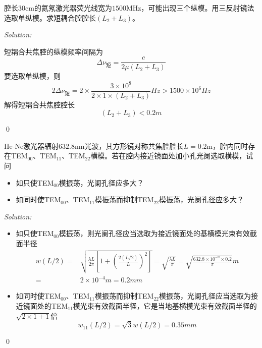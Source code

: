 \documentclass[12pt,a4paper]{article}
\newenvironment{problem}[2][Problem]{\begin{trivlist}
\item[\hskip \labelsep {\bfseries #1}\hskip \labelsep {\bfseries #2.}]}{\end{trivlist}}
\newenvironment{sol}
    {\emph{Solution:}
    }
    {
    \qed
    }
\begin{document}
\begin{problem}{4.1}
腔长$30$cm的氦氖激光器荧光线宽为$1500$MHz，可能出现三个纵模。用三反射镜法选取单纵模。求短耦合腔腔长$(L_2+L_3)$。
\end{problem}
\begin{sol}
短耦合共焦腔的纵模频率间隔为
\begin{equation}
\Delta\nu_{\text{短}}=\frac{c}{2\mu(L_2+L_3)}
\end{equation}
要选取单纵模，则
\begin{equation}
2\Delta\nu_{\text{短}}=2\times\frac{3\times10^8}{2\times1\times(L_2+L_3)}Hz>1500\times10^6Hz
\end{equation}
解得短耦合共焦腔腔长
\begin{equation}
(L_2+L_3)<0.2m
\end{equation}
\end{sol}

\begin{problem}{4.2}
He-Ne激光器辐射$632.8$nm光波，其方形镜对称共焦腔腔长$L=0.2$m，腔内同时存在TEM$_{00}$、TEM$_{11}$、TEM$_{22}$横模。若在腔内接近镜面处加小孔光阑选取横模，试问
\begin{itemize}
\item[(1)] 如只使TEM$_{00}$模振荡，光阑孔径应多大？
\item[(2)] 如同时使TEM$_{00}$、TEM$_{11}$模振荡而抑制TEM$_{22}$模振荡，光阑孔径应多大？
\end{itemize}
\end{problem}
\begin{sol}
\begin{itemize}
\item[(1)] 如只使TEM$_{00}$模振荡，则光阑孔径应当选取为接近镜面处的基横模光束有效截面半径
\begin{align}
\nonumber w(L/2)=&\sqrt{\frac{\lambda L}{2\pi}\left[1+\left(\frac{2(L/2)}{L}\right)^2\right]}=\sqrt{\frac{\lambda L}{\pi}}=\sqrt{\frac{632.8\times10^{-9}\times0.2}{\pi}}m\\
=&2\times10^{-4}m=0.2mm
\end{align}
\item[(2)] 如同时使TEM$_{00}$、TEM$_{11}$模振荡而抑制TEM$_{22}$模振荡，光阑孔径应当选取为接近镜面处的TEM$_{11}$模光束有效截面半径，它是当地基横模光束有效截面半径的$\sqrt{2\times1+1}$倍
\begin{equation}
w_{11}(L/2)=\sqrt{3}w(L/2)=0.35mm
\end{equation}
\end{itemize}
\end{sol}
\end{document}
